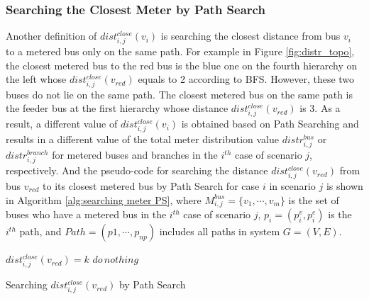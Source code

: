 \subsubsection{Searching the Closest Meter by Path Search}
\label{sect:Path_dist}
Another definition of $dist_{i,j}^{close}{(v_i)}$ is searching the closest distance from bus $v_i$ to a metered bus only on the same path. For example in Figure \ref{fig:distr_topo}, the closest metered bus to the red bus is the blue one on the fourth hierarchy on the left whose $dist_{i,j}^{close}{(v_{red})}$ equals to 2 according to BFS. However, these two buses do not lie on the same path. The closest metered bus on the same path is the feeder bus at the first hierarchy whose distance $dist_{i,j}^{close}{(v_{red})}$ is 3. As a result, a different value of $dist_{i,j}^{close}{(v_i)}$ is obtained based on Path Searching and results in a different value of the total meter distribution value $distr_{i,j}^{bus}$ or $distr_{i,j}^{branch}$ for metered buses and branches in the $i^{th}$ case of scenario $j$, respectively. And the pseudo-code for searching the distance $dist_{i,j}^{close}{(v_{red})}$ from bus $v_{red}$ to its closest metered bus by Path Search for case $i$ in scenario $j$ is shown in Algorithm \ref{alg:searching meter PS}, where $M_{i,j}^{bus}= \{v_1,\cdots,v_m \}$ is the set of buses who have a metered bus in the $i^{th}$ case of scenario $j$, $p_i=(p_i^v,p_i^e)$ is the $i^{th}$ path, and $Path=(p1,\cdots,p_{np})$ includes all paths in system $G=(V,E)$.

\bigskip
\begin{algorithm}[H]

{$dist_{i,j}^{close}{(v_{red})} = k$}
{$do \, nothing$}
\caption{Searching $dist_{i,j}^{close}{(v_{red})}$ by Path Search}
\label{alg:searching meter PS}
\end{algorithm}

